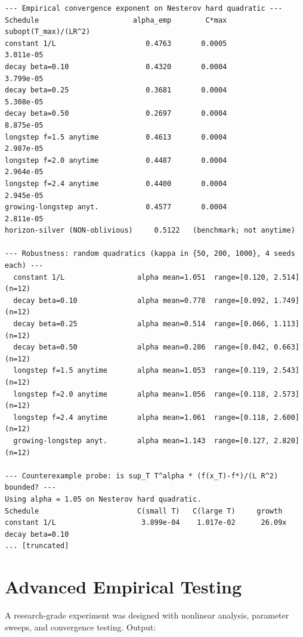 \documentclass[11pt]{article}
\begin{document}
\begin{lstlisting}
--- Empirical convergence exponent on Nesterov hard quadratic ---
Schedule                      alpha_emp        C*max    subopt(T_max)/(LR^2)
constant 1/L                     0.4763       0.0005               3.011e-05
decay beta=0.10                  0.4320       0.0004               3.799e-05
decay beta=0.25                  0.3681       0.0004               5.308e-05
decay beta=0.50                  0.2697       0.0004               8.875e-05
longstep f=1.5 anytime           0.4613       0.0004               2.987e-05
longstep f=2.0 anytime           0.4487       0.0004               2.964e-05
longstep f=2.4 anytime           0.4400       0.0004               2.945e-05
growing-longstep anyt.           0.4577       0.0004               2.811e-05
horizon-silver (NON-oblivious)     0.5122   (benchmark; not anytime)

--- Robustness: random quadratics (kappa in {50, 200, 1000}, 4 seeds each) ---
  constant 1/L                 alpha mean=1.051  range=[0.120, 2.514]  (n=12)
  decay beta=0.10              alpha mean=0.778  range=[0.092, 1.749]  (n=12)
  decay beta=0.25              alpha mean=0.514  range=[0.066, 1.113]  (n=12)
  decay beta=0.50              alpha mean=0.286  range=[0.042, 0.663]  (n=12)
  longstep f=1.5 anytime       alpha mean=1.053  range=[0.119, 2.543]  (n=12)
  longstep f=2.0 anytime       alpha mean=1.056  range=[0.118, 2.573]  (n=12)
  longstep f=2.4 anytime       alpha mean=1.061  range=[0.118, 2.600]  (n=12)
  growing-longstep anyt.       alpha mean=1.143  range=[0.127, 2.820]  (n=12)

--- Counterexample probe: is sup_T T^alpha * (f(x_T)-f*)/(L R^2) bounded? ---
Using alpha = 1.05 on Nesterov hard quadratic.
Schedule                       C(small T)   C(large T)     growth
constant 1/L                    3.899e-04    1.017e-02      26.09x
decay beta=0.10      
... [truncated]
\end{lstlisting}


\section{Advanced Empirical Testing}

A research-grade experiment was designed with nonlinear analysis, parameter sweeps,
and convergence testing. Output:
\end{document}

